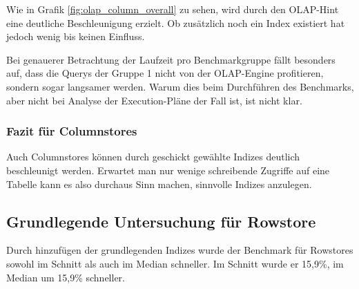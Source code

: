 Wie in Grafik \ref{fig:olap_column_overall} zu sehen, wird durch den OLAP-Hint eine deutliche Beschleunigung erzielt. Ob zusätzlich noch ein Index existiert hat jedoch wenig bis keinen Einfluss.

Bei genauerer Betrachtung der Laufzeit pro Benchmarkgruppe fällt besonders auf, dass die Querys der Gruppe 1 nicht von der OLAP-Engine profitieren, sondern sogar langsamer werden. 
Warum dies beim Durchführen des Benchmarks, aber nicht bei Analyse der Execution-Pläne der Fall ist, ist nicht klar.
\fi

\subsubsection{Fazit für Columnstores}
Auch Columnstores können durch geschickt gewählte Indizes deutlich beschleunigt werden. Erwartet man nur wenige schreibende Zugriffe auf eine Tabelle kann es also durchaus Sinn machen, sinnvolle Indizes anzulegen.

\subsection{Grundlegende Untersuchung für Rowstore}
Durch hinzufügen der grundlegenden Indizes wurde der Benchmark
für Rowstores sowohl im Schnitt als auch im Median schneller.
Im Schnitt wurde er 15,9\%, im Median um 15,9\% schneller.


